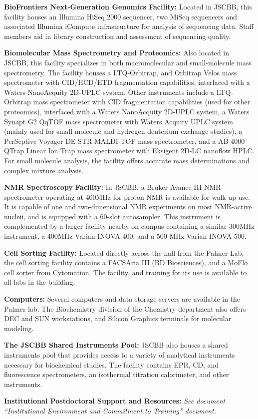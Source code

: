 \documentclass{F32}
\begin{document}
  {\bf BioFrontiers Next-Generation Genomics Facility:} Located in JSCBB, this facility houses an Illumina HiSeq 2000 sequencer, two MiSeq sequencers and associated Illumina iCompute infrastructure for analysis of sequencing data. Staff members aid in library construction and assessment of sequencing quality.

  {\bf Biomolecular Mass Spectrometry and Proteomics:} Also located in JSCBB, this facility specializes in both macromolecular and small-molecule mass spectrometry. The facility houses a LTQ-Orbitrap, and Orbitrap Velos mass spectrometer with CID/HCD/ETD fragmentation capabilities, interfaced with a Waters NanoAcquity 2D-UPLC system. Other instruments include a LTQ-Orbitrap mass spectrometer with CID fragmentation capabilities (used for other proteomics), interfaced with a Waters NanoAcquity 2D-UPLC system, a Waters Synapt G2 QqTOF mass spectrometer with Waters Acquity UPLC system (mainly used for small molecule and hydrogen-deuterium exchange studies), a PerSeptive Voyager DE-STR MALDI-TOF mass spectrometer, and a AB 4000 QTrap Linear Ion Trap mass spectrometer with Eksigent 2D-LC nanoflow HPLC. For small molecule analysis, the facility offers accurate mass determinations and complex mixture analysis.

  {\bf NMR Spectroscopy Facility:} In JSCBB, a Bruker Avance-III NMR spectrometer operating at 400MHz for proton NMR is available for walk-up use. It is capable of one and two-dimensional NMR experiments on most NMR-active nucleii, and is equipped with a 60-slot autosampler. This instrument is complemented by a larger facility nearby on campus containing a similar 300MHz instrument, a 400MHz Varian INOVA 400, and a 500 MHz Varian INOVA 500.

  {\bf Cell Sorting Facility:} Located directly across the hall from the Palmer Lab, the cell sorting facility contains a FACSAria III (BD Biosciences), and a MoFlo cell sorter from Cytomation. The facility, and training for its use is available to all labs in the building.

  {\bf Computers:} Several computers and data storage servers are available in the Palmer lab. The Biochemistry division of the Chemistry department also offers DEC and SUN workstations, and Silicon Graphics terminals for molecular modeling.

  {\bf The JSCBB Shared Instruments Pool:} JSCBB also houses a shared instruments pool that provides access to a variety of analytical instruments necessary for biochemical studies. The facility contains EPR, CD, and fluorescence spectrometers, an isothermal titration calorimeter, and other instruments.

  {\bf Institutional Postdoctoral Support and Resources:} \textit{See document ``Institutional Environment and Commitment to Training'' document.}
\end{document}
